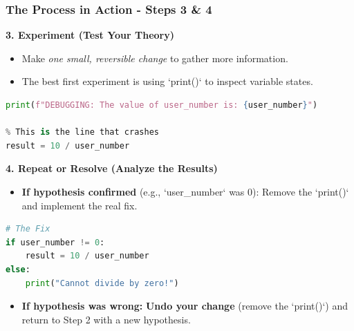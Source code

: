 \documentclass{beamer}
\begin{document}
\begin{frame}[fragile]
    \frametitle{The Process in Action - Steps 3 \& 4}

    \textbf{3. Experiment (Test Your Theory)}
    \begin{itemize}
        \item Make \textit{one small, reversible change} to gather more information.
        \item The best first experiment is using `print()` to inspect variable states.
    \end{itemize}
    \begin{lstlisting}[language=Python, caption={Add a print statement before the error line to test.}, label=lst:debugprint]
% Let's test if user_number is actually 0
print(f"DEBUGGING: The value of user_number is: {user_number}")

% This is the line that crashes
result = 10 / user_number 
    \end{lstlisting}
    
    \vspace{1em}
    \textbf{4. Repeat or Resolve (Analyze the Results)}
    \begin{itemize}
        \item \textbf{If hypothesis confirmed} (e.g., `user_number` was 0): Remove the `print()` and implement the real fix.
    \end{itemize}
    \begin{lstlisting}[language=Python, caption={The permanent fix after confirming the cause.}, label=lst:debugfix]
# The Fix
if user_number != 0:
    result = 10 / user_number
else:
    print("Cannot divide by zero!")
    \end{lstlisting}
    \begin{itemize}
        \item \textbf{If hypothesis was wrong:} \textbf{Undo your change} (remove the `print()`) and return to Step 2 with a new hypothesis.
    \end{itemize}
\end{frame}
\end{document}
